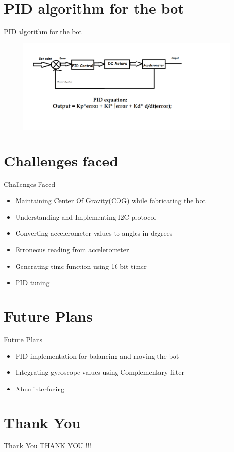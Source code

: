\documentclass[10pt, a4paper]{beamer}
\begin{document}
\section{PID algorithm for the bot}
\begin{frame}{PID algorithm for the bot}
	\begin{figure}
		\includegraphics[scale=0.35]{PID.png}\\
		
	\end{figure}
\end{frame}

\section{Challenges faced}
\begin{frame}{Challenges Faced}
	\begin{itemize}
	 \item Maintaining Center Of Gravity(COG) while fabricating the bot
	 \item Understanding and Implementing I2C protocol
	 \item Converting accelerometer values to angles in degrees
	 \item Erroneous reading from accelerometer
	 \item Generating time function using 16 bit timer
	 \item PID tuning  
	 \end{itemize}
\end{frame}

\section{Future Plans}
\begin{frame}{Future Plans}
	\begin{itemize}
		\item PID implementation for balancing and moving the bot
		\item Integrating gyroscope values using Complementary filter
		\item Xbee interfacing 
	\end{itemize}
\end{frame}


\section{Thank You}
\begin{frame}{Thank You}
	\centering THANK YOU !!!
\end{frame}
\end{document}
